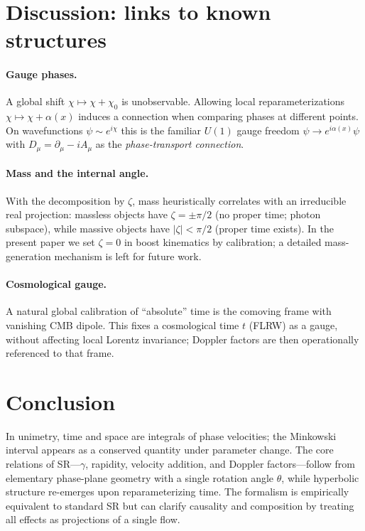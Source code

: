 \documentclass[11pt]{article}
\numberwithin{equation}{section}
\begin{document}
\section{Discussion: links to known structures}
\paragraph{Gauge phases.} A global shift $\chi\mapsto\chi+\chi_0$ is unobservable. Allowing local reparameterizations $\chi\mapsto\chi+\alpha(x)$ induces a connection when comparing phases at different points. On wavefunctions $\psi\sim e^{i\chi}$ this is the familiar $U(1)$ gauge freedom $\psi\to e^{i\alpha(x)}\psi$ with $D_\mu=\partial_\mu-iA_\mu$ as the \emph{phase-transport connection}.

\paragraph{Mass and the internal angle.} With the decomposition by $\zeta$, mass heuristically correlates with an irreducible real projection: massless objects have $\zeta=\pm\pi/2$ (no proper time; photon subspace), while massive objects have $|\zeta|<\pi/2$ (proper time exists). In the present paper we set $\zeta=0$ in boost kinematics by calibration; a detailed mass-generation mechanism is left for future work.

\paragraph{Cosmological gauge.} A natural global calibration of ``absolute'' time is the comoving frame with vanishing CMB dipole. This fixes a cosmological time $t$ (FLRW) as a gauge, without affecting local Lorentz invariance; Doppler factors are then operationally referenced to that frame.

\section{Conclusion}
In unimetry, time and space are integrals of phase velocities; the Minkowski interval appears as a conserved quantity under parameter change. The core relations of SR---$\gamma$, rapidity, velocity addition, and Doppler factors---follow from elementary phase-plane geometry with a single rotation angle $\theta$, while hyperbolic structure re-emerges upon reparameterizing time. The formalism is empirically equivalent to standard SR but can clarify causality and composition by treating all effects as projections of a single flow.
\end{document}
